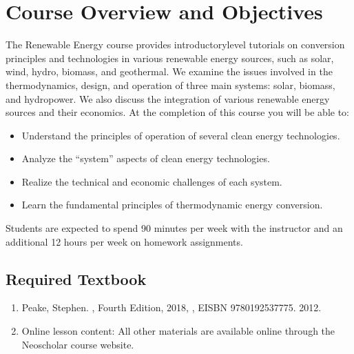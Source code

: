 \documentclass[letterpaper,10pt,english]{jupyterBook}
\begin{document}
\chapter{Course Overview and Objectives}
\label{\detokenize{Syllabus:course-overview-and-objectives}}
\sphinxAtStartPar
The Renewable Energy course provides introductory\sphinxhyphen{}level tutorials on
conversion principles and technologies in various renewable energy sources,
such as solar, wind, hydro, biomass, and geothermal. We examine the
issues involved in the thermodynamics, design, and operation of three
main systems: solar, biomass, and hydropower. We also discuss the integration of various renewable energy
sources and their economics. At the completion of this course you will
be able to:
\begin{itemize}
\item {} 
\sphinxAtStartPar
Understand the principles of operation of several clean energy
technologies.

\item {} 
\sphinxAtStartPar
Analyze the “system” aspects of clean energy technologies.

\item {} 
\sphinxAtStartPar
Realize the technical and economic challenges of each system.

\item {} 
\sphinxAtStartPar
Learn the fundamental principles of thermodynamic energy conversion.

\end{itemize}

\sphinxAtStartPar
Students are expected to spend 90 minutes per week with the instructor
and an additional 1\sphinxhyphen{}2 hours per week on homework assignments.


\section{Required Textbook}
\label{\detokenize{Syllabus:required-textbook}}\begin{enumerate}
%
\item {} 
\sphinxAtStartPar
Peake, Stephen. ,
Fourth Edition, 2018, , EISBN
978\sphinxhyphen{}0\sphinxhyphen{}19\sphinxhyphen{}253777\sphinxhyphen{}5. 2012. 

\item {} 
\sphinxAtStartPar
Online lesson content: All other materials are available online
through the Neoscholar course website.

\end{enumerate}
\end{document}
